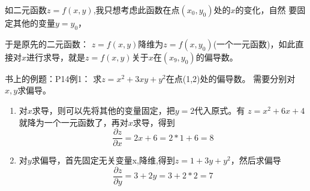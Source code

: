 \documentclass[a4paper]{ctexart}
\begin{document}
\begin{multicols}{2}
\par
如二元函数$z=f(x,y)$,我只想考虑此函数在点$(x_0, y_0)$处的$x$的变化，自然
要固定其他的变量$y=y_0$，
\par
于是原先的二元函数： $z=f(x,y)$降维为$z=f(x,y_0)$(一个一元函数)，如此直接对$x$进行求导，就是$z=f(x,y)$关于$x$在$(x_9, y_0)$的偏导数。
\par
书上的例题：P14例1： 求$z=x^2 + 3xy + y^2$在点(1,2)处的偏导数。
需要分别对$x,y$求偏导。
\begin{enumerate}
\item 对$x$求导，则可以先将其他的变量固定，把$y=2$代入原式。有
    $ z = x^2 + 6x + 4 $
    就降为一个一元函数了，再对$x$求导，得到
    $$
    \frac{\partial z}
    {\partial x}
    = 2x + 6 = 2*1+6 = 8
    $$
\item 对$y$求偏导，首先固定无关变量x,降维,得到$z=1+3y+y^2$，然后求偏导
    $$
    \frac{\partial z}
    {\partial y}
    = 3 + 2y = 3 + 2*2 = 7
    $$
\end{enumerate}

\end{multicols}
\end{document}
